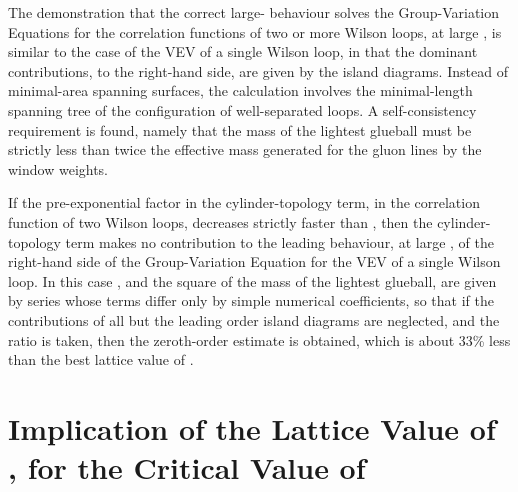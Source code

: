 \documentclass[a4paper,12pt,oneside]{article}
\begin{document}
The demonstration that the correct large-\coordHE{} behaviour solves the
Group-Variation Equations for the correlation functions of two or more
Wilson loops, at large \coordHE{}, is similar to the case of the VEV of a single
Wilson loop, in that the dominant contributions, to the right-hand side, are
given by the island diagrams.  Instead of minimal-area spanning surfaces,
the calculation involves the minimal-length spanning tree of the
configuration of well-separated loops.  A self-consistency requirement is
found, namely that the mass of the lightest glueball must be strictly less
than twice the effective mass generated for the gluon lines by the window
weights.

If the pre-exponential factor in the cylinder-topology term, in the
correlation function of two Wilson loops, decreases strictly faster than
\coordHE{}, then the cylinder-topology term makes no contribution to
the leading behaviour, at large \coordHE{}, of the right-hand side of the
Group-Variation Equation for the VEV of a single Wilson loop.  In this case
\myHighlight{$\sigma$}\coordHE{}, and the square of the mass \coordHE{} of the lightest glueball,
are given by series whose terms differ only by simple numerical
coefficients, so that if the contributions of all but the leading order
island diagrams are neglected, and the ratio is taken, then the zeroth-order
estimate \coordHE{} is obtained, which is about 33\%
less than the best lattice value of \coordHE{} \cite{Teper}.

\section{Implication of the Lattice Value of \coordHE{}, for the 
Critical Value of \coordHE{}}
\end{document}
